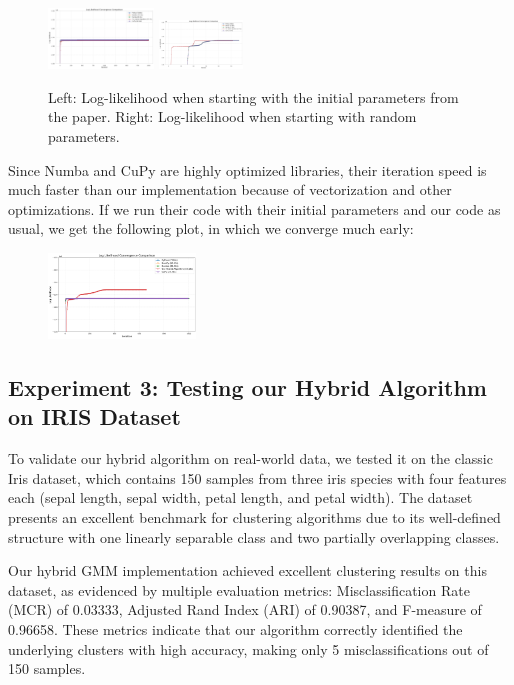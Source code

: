 \documentclass[conference]{IEEEtran}
\begin{document}
\begin{figure}[h!]
    \centering
    \includegraphics[width=0.25\textwidth]{azizi1.png}
    \includegraphics[width=0.2\textwidth]{azizi2.png}
    \caption{Left: Log-likelihood when starting with the initial parameters from the paper. Right: Log-likelihood when starting with random parameters.}
\end{figure}

Since Numba and CuPy are highly optimized libraries, their iteration speed is much faster than our implementation because of vectorization and other optimizations. If we run their code with their initial parameters and our code as usual, we get the following plot, in which we converge much early:

\begin{figure}[h!]
    \centering
    \includegraphics[width=0.35\textwidth]{azizi3.png}
\end{figure}

\subsection*{Experiment 3: Testing our Hybrid Algorithm on IRIS Dataset}

To validate our hybrid algorithm on real-world data, we tested it on the classic Iris dataset, which contains 150 samples from three iris species with four features each (sepal length, sepal width, petal length, and petal width). The dataset presents an excellent benchmark for clustering algorithms due to its well-defined structure with one linearly separable class and two partially overlapping classes.

Our hybrid GMM implementation achieved excellent clustering results on this dataset, as evidenced by multiple evaluation metrics: Misclassification Rate (MCR) of 0.03333, Adjusted Rand Index (ARI) of 0.90387, and F-measure of 0.96658. These metrics indicate that our algorithm correctly identified the underlying clusters with high accuracy, making only 5 misclassifications out of 150 samples.
\end{document}

